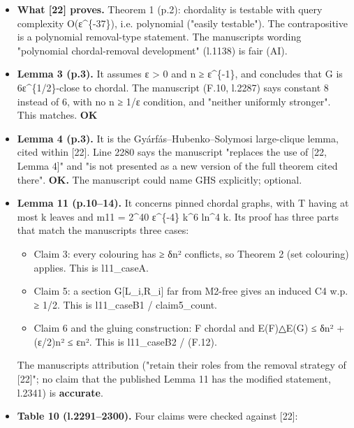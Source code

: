 \documentclass[
]{article}
\providecommand{\tightlist}{%
  \setlength{\itemsep}{0pt}\setlength{\parskip}{0pt}}
\begin{document}
\begin{itemize}
\item
  \textbf{What {[}22{]} proves.} Theorem 1 (p.2): chordality is testable
  with query complexity O(ε\^{}\{-37\}), i.e. polynomial ("easily
  testable"). The contrapositive is a polynomial removal-type statement.
  The manuscript\textquotesingle s wording "polynomial chordal-removal
  development" (l.1138) is fair (AI).
\item
  \textbf{Lemma 3 (p.3).} It assumes ε \textgreater{} 0 and n ≥
  ε\^{}\{-1\}, and concludes that G is 6ε\^{}\{1/2\}-close to chordal.
  The manuscript (F.10, l.2287) says constant 8 instead of 6, with no n
  ≥ 1/ε condition, and "neither uniformly stronger". This matches.
  \textbf{OK}
\item
  \textbf{Lemma 4 (p.3).} It is the Gyárfás--Hubenko--Solymosi
  large-clique lemma, cited within {[}22{]}. Line 2280 says the
  manuscript "replaces the use of {[}22, Lemma 4{]}" and "is not
  presented as a new version of the full theorem cited there".
  \textbf{OK.} The manuscript could name GHS explicitly; optional.
\item
  \textbf{Lemma 11 (p.10--14).} It concerns pinned chordal graphs, with
  T having at most k leaves and m11 = 2\^{}40 ε\^{}\{-4\} k\^{}6 ln\^{}4
  k. Its proof has three parts that match the
  manuscript\textquotesingle s three cases:

  \begin{itemize}
  \tightlist
  \item
    Claim 3: every colouring has ≥ δn² conflicts, so Theorem 2 (set
    colouring) applies. This is l11\_caseA.
  \item
    Claim 5: a section G{[}L\_i,R\_i{]} far from M2-free gives an
    induced C4 w.p. ≥ 1/2. This is l11\_caseB1 / claim5\_count.
  \item
    Claim 6 and the gluing construction: F chordal and
    \textbar E(F)△E(G)\textbar{} ≤ δn² + (ε/2)n² ≤ εn². This is
    l11\_caseB2 / (F.12).
  \end{itemize}

  The manuscript\textquotesingle s attribution ("retain their roles from
  the removal strategy of {[}22{]}"; no claim that the published Lemma
  11 has the modified statement, l.2341) is \textbf{accurate}.
\item
  \textbf{Table 10 (l.2291--2300).} Four claims were checked against
  {[}22{]}:


\end{itemize}
\end{document}
